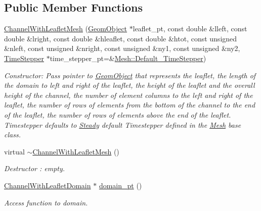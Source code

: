 \subsection*{Public Member Functions}
\begin{DoxyCompactItemize}
\item 
\hyperlink{classoomph_1_1ChannelWithLeafletMesh_ab210be34e9d7f72af9aefee618d41f3d}{Channel\+With\+Leaflet\+Mesh} (\hyperlink{classoomph_1_1GeomObject}{Geom\+Object} $\ast$leaflet\+\_\+pt, const double \&lleft, const double \&lright, const double \&hleaflet, const double \&htot, const unsigned \&nleft, const unsigned \&nright, const unsigned \&ny1, const unsigned \&ny2, \hyperlink{classoomph_1_1TimeStepper}{Time\+Stepper} $\ast$time\+\_\+stepper\+\_\+pt=\&\hyperlink{classoomph_1_1Mesh_a12243d0fee2b1fcee729ee5a4777ea10}{Mesh\+::\+Default\+\_\+\+Time\+Stepper})
\begin{DoxyCompactList}\small\item\em Constructor\+: Pass pointer to \hyperlink{classoomph_1_1GeomObject}{Geom\+Object} that represents the leaflet, the length of the domain to left and right of the leaflet, the height of the leaflet and the overall height of the channel, the number of element columns to the left and right of the leaflet, the number of rows of elements from the bottom of the channel to the end of the leaflet, the number of rows of elements above the end of the leaflet. Timestepper defaults to \hyperlink{classoomph_1_1Steady}{Steady} default Timestepper defined in the \hyperlink{classoomph_1_1Mesh}{Mesh} base class. \end{DoxyCompactList}\item 
virtual \hyperlink{classoomph_1_1ChannelWithLeafletMesh_ad767dc06cf65becc207f780f8100657c}{$\sim$\+Channel\+With\+Leaflet\+Mesh} ()
\begin{DoxyCompactList}\small\item\em Destructor \+: empty. \end{DoxyCompactList}\item 
\hyperlink{classoomph_1_1ChannelWithLeafletDomain}{Channel\+With\+Leaflet\+Domain} $\ast$ \hyperlink{classoomph_1_1ChannelWithLeafletMesh_a775c95ffa8fb9b7b512fc767528eab22}{domain\+\_\+pt} ()
\begin{DoxyCompactList}\small\item\em Access function to domain. \end{DoxyCompactList}\end{DoxyCompactItemize}
